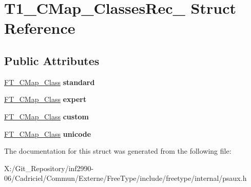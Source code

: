 \hypertarget{struct_t1___c_map___classes_rec__}{\section{T1\-\_\-\-C\-Map\-\_\-\-Classes\-Rec\-\_\- Struct Reference}
\label{struct_t1___c_map___classes_rec__}
}
\subsection*{Public Attributes}
\begin{DoxyCompactItemize}
\item 
\hypertarget{struct_t1___c_map___classes_rec___a11bc9e986af1c0cf91bd67e2e30028ca}{\hyperlink{struct_f_t___c_map___class_rec__}{F\-T\-\_\-\-C\-Map\-\_\-\-Class} {\bfseries standard}}\label{struct_t1___c_map___classes_rec___a11bc9e986af1c0cf91bd67e2e30028ca}

\item 
\hypertarget{struct_t1___c_map___classes_rec___a9576c404d5197dd66498725eacde1302}{\hyperlink{struct_f_t___c_map___class_rec__}{F\-T\-\_\-\-C\-Map\-\_\-\-Class} {\bfseries expert}}\label{struct_t1___c_map___classes_rec___a9576c404d5197dd66498725eacde1302}

\item 
\hypertarget{struct_t1___c_map___classes_rec___a21378ef457d58cc00f357011f45fba5e}{\hyperlink{struct_f_t___c_map___class_rec__}{F\-T\-\_\-\-C\-Map\-\_\-\-Class} {\bfseries custom}}\label{struct_t1___c_map___classes_rec___a21378ef457d58cc00f357011f45fba5e}

\item 
\hypertarget{struct_t1___c_map___classes_rec___aab1eef66893dd7b0d25897612d056d4a}{\hyperlink{struct_f_t___c_map___class_rec__}{F\-T\-\_\-\-C\-Map\-\_\-\-Class} {\bfseries unicode}}\label{struct_t1___c_map___classes_rec___aab1eef66893dd7b0d25897612d056d4a}

\end{DoxyCompactItemize}


The documentation for this struct was generated from the following file\-:\begin{DoxyCompactItemize}
\item 
X\-:/\-Git\-\_\-\-Repository/inf2990-\/06/\-Cadriciel/\-Commun/\-Externe/\-Free\-Type/include/freetype/internal/psaux.\-h\end{DoxyCompactItemize}
